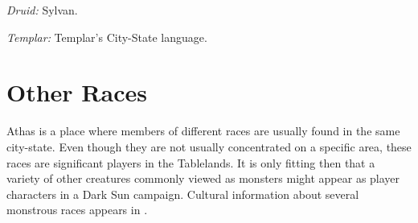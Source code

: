 \textit{Druid:} Sylvan.

\textit{Templar:} Templar's City-State language.



% 






% 



\section{Other Races}
Athas is a place where members of different races are usually found in the same city-state. Even though they are not usually concentrated on a specific area, these races are significant players in the Tablelands. It is only fitting then that a variety of other creatures commonly viewed as monsters might appear as player characters in a {\tableheader Dark Sun} campaign. Cultural information about several monstrous races appears in .
